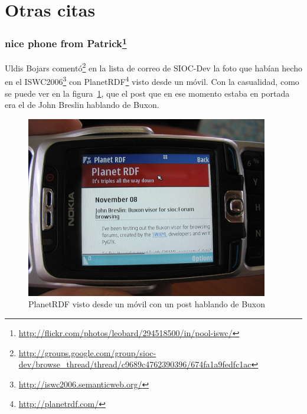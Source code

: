 \section{Otras citas}

\subsubsection*{nice phone from Patrick\footnote{\url{http://flickr.com/photos/leobard/294518500/in/pool-iswc/}}}

Uldis Bojars comentó\footnote{\url{http://groups.google.com/group/sioc-dev/browse_thread/thread/c9689c4762390396/674fa1a9fedfc1ac}}
en la lista de correo de SIOC-Dev la foto que habían hecho en el
ISWC2006\footnote{\url{http://iswc2006.semanticweb.org/}} con 
PlanetRDF\footnote{\url{http://planetrdf.com/}} visto desde un móvil. Con la casualidad,
como se puede ver en la figura~\ref{fig:planetrdf-mobile}, que el post que en ese momento 
estaba en portada era el de John Breslin hablando de Buxon.

\begin{figure}[ht]
	\centering
	\includegraphics{images/screenshots/planetrdf-mobile.png}
	\caption{PlanetRDF visto desde un móvil con un post hablando de Buxon}
	\label{fig:planetrdf-mobile}
\end{figure}


